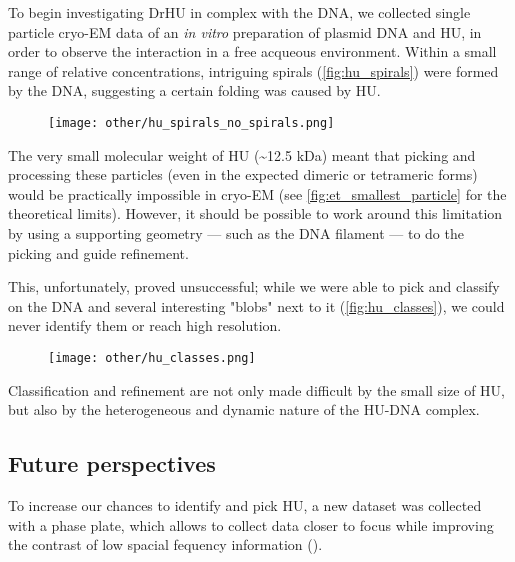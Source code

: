 To begin investigating DrHU in complex with the DNA, we collected single particle cryo-EM data of an \textit{in vitro} preparation of plasmid DNA and HU, in order to observe the interaction in a free acqueous environment.
Within a small range of relative concentrations, intriguing spirals (\autoref{fig:hu_spirals}) were formed by the DNA, suggesting a certain folding was caused by HU.

\begin{figure}[ht]
    \centering
    \texttt{[image: other/hu\_spirals\_no\_spirals.png]}
    \label{fig:hu_spirals}
\end{figure}

The very small molecular weight of HU (\sim12.5 kDa) meant that picking and processing these particles (even in the expected dimeric or tetrameric forms) would be practically impossible in cryo-EM (see \autoref{fig:et_smallest_particle} for the theoretical limits).
However, it should be possible to work around this limitation by using a supporting geometry --- such as the DNA filament --- to do the picking and guide refinement.

This, unfortunately, proved unsuccessful; while we were able to pick and classify on the DNA and several interesting "blobs" next to it (\autoref{fig:hu_classes}), we could never identify them or reach high resolution.

\begin{figure}[ht]
    \centering
    \texttt{[image: other/hu\_classes.png]}
    \label{fig:hu_classes}
\end{figure}

Classification and refinement are not only made difficult by the small size of HU, but also by the heterogeneous and dynamic nature of the HU-DNA complex.

\subsection{Future perspectives}

To increase our chances to identify and pick HU, a new dataset was collected with a phase plate, which allows to collect data closer to focus while improving the contrast of low spacial fequency information ().

